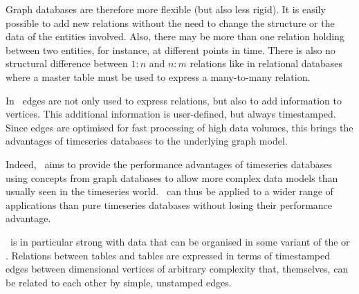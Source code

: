 \begin{minipage}{\textwidth}
\begin{center}
\end{center}
\end{minipage}

Graph databases are therefore more flexible
(but also less rigid).
It is easily possible to add new relations
without the need to change the structure or
the data of the entities involved. Also,
there may be more than one relation holding
between two entities, for instance, at
different points in time. There is also
no structural difference between
$1:n$ and $n:m$ relations
like in relational databases where
a master table must be used
to express a many-to-many relation.

In \nowdb\ edges are not only
used to express relations,
but also to add information to vertices.
This additional information
is user-defined, but always
timestamped.
Since edges are optimised
for fast processing of high data volumes,
this brings the advantages of timeseries databases
to the underlying graph model.

Indeed, \nowdb\ aims to provide the
performance advantages of timeseries databases
using concepts from graph databases
to allow more complex data models
than usually seen in the timeseries world.
\nowdb\ can thus be applied to a wider
range of applications than pure
timeseries databases without losing
their performance advantage.

\nowdb\ is in particular strong with
data that can be organised in some variant of the
 or . Relations between
 tables and  tables
are expressed in terms of
timestamped edges
between dimensional vertices of
arbitrary complexity that, themselves, 
can be related to each other by
simple, unstamped edges.

